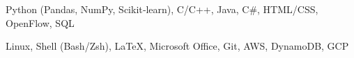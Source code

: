 

\begin{cvskills}

  \cvskill
    { } %
    {Python (Pandas, NumPy, Scikit‑learn), C/C++, Java, C\#, HTML/CSS, OpenFlow, SQL} %

  \cvskill
    { } %
    {Linux, Shell (Bash/Zsh), \LaTeX, Microsoft Office, Git, AWS, DynamoDB, GCP} %
  \cvskill
    { } %
    { } %

\end{cvskills}
